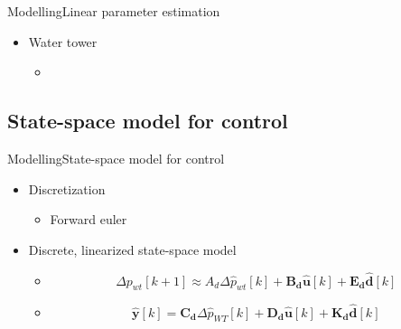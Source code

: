 \begin{frame}{Modelling}{Linear parameter estimation}
\begin{itemize}
	\item<1-> Water tower
	\begin{itemize}
		\item<1->[] 
			\begin{figure}[H]
			\centering
			 
			\end{figure}	
	\end{itemize}	
\end{itemize}
\end{frame}


\subsection{State-space model for control}

\begin{frame}{Modelling}{State-space model for control}
\begin{itemize}
	\item<1-> Discretization 
	\begin{itemize}
		\item<1-> Forward euler
	\end{itemize}	
\end{itemize}

\begin{itemize}
	\item<2-> Discrete, linearized state-space model 
	\begin{itemize}
		\item<2->[]
		\begin{equation}
		\Delta p_{wt}[k+1] \approx A_d \Delta \hat{p}_{wt}[k]  + \pmb{B_d} \pmb{\hat{u}}[k] + \pmb{E_d} \pmb{\hat{d}}[k] 
		\end{equation}
		\item<2->[]
		\begin{equation}
 		\pmb{\hat{y}}[k] = \pmb{C_d} \Delta \hat{p}_{WT}[k] + \pmb{D_d} \pmb{\hat{u}}[k] + \pmb{K_d} \pmb{\hat{d}}[k]
		\end{equation}
	\end{itemize}	
\end{itemize}
\end{frame}

